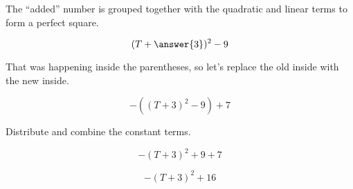 \documentclass{ximera}
\begin{document}
\begin{exercise}
\begin{procedure}
The ``added'' number is grouped together with the quadratic and linear terms to form a perfect square.



\[ ( T + \answer{3} )^2  - 9 \]





\end{procedure}


That was happening inside the parentheses, so let's replace the old inside with the new inside.


\[ -( ( T + 3 )^2  - 9 ) + 7 \]




Distribute and combine the constant terms.



\[ -( T + 3 )^2  + 9 + 7 \]


\[ -( T + 3 )^2  + 16  \]



\end{exercise}
\end{document}
